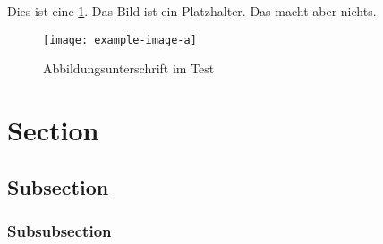 Dies ist eine \ref{fig:abb1}. Das Bild ist ein Platzhalter. Das macht aber nichts.

\begin{figure}[H]
\centering
\texttt{[image: example-image-a]}
\caption[Abbildungsunterschrift im Abbildungsverzeichnis]{Abbildungsunterschrift im Test}
\label{fig:abb1}
\end{figure} 



\section{Section}

\subsection{Subsection}

\subsubsection{Subsubsection}
